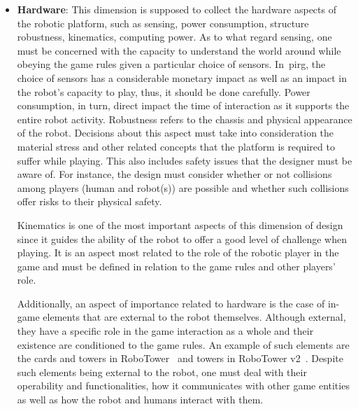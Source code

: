 \begin{itemize}[leftmargin=*,labelsep=5.8mm]
\item \textbf{Hardware}: This dimension is supposed to collect the hardware aspects of the robotic platform, such as sensing, power consumption, structure robustness, kinematics, computing power. As to what regard sensing, one must be concerned with the capacity to understand the world around while obeying the game rules given a particular choice of sensors. In~\gls{pirg}, the choice of sensors has a considerable monetary impact as well as an impact in the robot's capacity to play, thus, it should be done carefully. Power consumption, in turn, direct impact the time of interaction as it supports the entire robot activity. Robustness refers to the chassis and physical appearance of the robot. Decisions about this aspect must  take into consideration the material stress and other related concepts that the platform is required to suffer while playing. This also includes safety issues that the designer must be aware of. For instance, the design must consider whether or not collisions among players (human and robot(s)) are possible and whether such collisions offer risks to their physical safety. 

Kinematics is one of the most important aspects of this dimension of design since it guides the ability of the robot to offer a good level of challenge when playing. It is an aspect most related to the role of the robotic player in the game and must be defined in relation to the game rules and other players' role. 

Additionally,  an aspect of importance related to hardware is the case of in-game elements that are external to the robot themselves. Although external, they have a specific role in the game interaction as a whole and their existence are conditioned to the game rules. An example of such elements are the cards and towers in RoboTower~\citep{bonarini_timing_2014} and towers in RoboTower v2~\citep{oliveira_activity_2017}. Despite such elements being external to the robot, one must deal with their operability and functionalities, how it communicates with other game entities as well as how the robot and humans interact with them.


\end{itemize}
